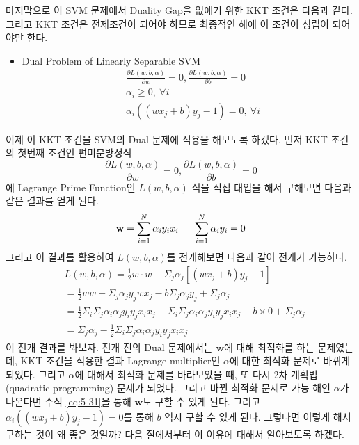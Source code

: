 \documentclass[a4paper]{oblivoir}
\begin{document}
마지막으로 이 SVM 문제에서 Duality Gap을 없애기 위한 KKT 조건은 다음과 같다. 그리고 KKT 조건은 전제조건이 되어야 하므로 최종적인 해에 이 조건이 성립이 되어야만 한다.
\begin{itemize}\setlength\itemsep{-\parsep}
	\item Dual Problem of Linearly Separable SVM
	\begin{equation}
	\begin{split}
	&\frac{\partial L(w,b,\alpha)}{\partial w}=0, \frac{\partial L(w,b,\alpha)}{\partial b}=0\\
	&\alpha_i \geq0,\ \forall i\\
	&\alpha_i ((wx_j+b)y_j-1)=0,\ \forall i
	\end{split}
	\label{eq:5-30}
	\end{equation}
\end{itemize}

이제 이 KKT 조건을 SVM의 Dual 문제에 적용을 해보도록 하겠다. 먼저 KKT 조건의 첫번째 조건인 편미분방정식 $$\frac{\partial L(w,b,\alpha)}{\partial w}=0, \frac{\partial L(w,b,\alpha)}{\partial b}=0$$에 Lagrange Prime Function인 $L(w,b,\alpha)$ 식을 직접 대입을 해서 구해보면 다음과 같은 결과를 얻게 된다.
\begin{equation}
\mathbf{w}=\sum_{i=1}^{N} \alpha_i y_i x_i\indent
\sum_{i=1}^{N} \alpha_i y_i=0
\label{eq:5-31}
\end{equation}
그리고 이 결과를 활용하여 $L(w,b,\alpha)$를 전개해보면 다음과 같이 전개가 가능하다.
\begin{equation}
\begin{split}
&L(w,b,\alpha)=\frac{1}{2}w\cdot w-\Sigma_{j}\alpha_j [(wx_j+b)y_j-1]\\
&=\frac{1}{2}ww-\Sigma_{j} \alpha_j y_j w x_j -b\Sigma_{j}\alpha_j y_j+\Sigma_j \alpha_j\\
&=\frac{1}{2}\Sigma_{i}\Sigma_{j}\alpha_i \alpha_j y_i y_j x_i x_j-\Sigma_{i}\Sigma_{j}\alpha_i \alpha_j y_i y_j x_i x_j-b\times 0+\Sigma_j \alpha_j\\
&=\Sigma_{j}\alpha_{j}-\frac{1}{2}\Sigma_{i}\Sigma_{j}\alpha_i \alpha_j y_i y_j x_i x_j
\end{split}
\end{equation}
\indent 이 전개 결과를 봐보자. 전개 전의 Dual 문제에서는 $\mathbf{w}$에 대해 최적화를 하는 문제였는데, KKT 조건을 적용한 결과 Lagrange multiplier인 $\alpha$에 대한 최적화 문제로 바뀌게 되었다. 그리고 $\alpha$에 대해서 최적화 문제를 바라보았을 때, 또 다시 2차 계획법(quadratic programming) 문제가 되었다. 그리고 바뀐 최적화 문제로 가능 해인 $\alpha$가 나온다면 수식 \eqref{eq:5-31}을 통해 $\mathbf{w}$도 구할 수 있게 된다. 그리고 $\alpha_i((wx_j+b)y_j-1)=0$를 통해 $b$ 역시 구할 수 있게 된다. 그렇다면 이렇게 해서 구하는 것이 왜 좋은 것일까? 다음 절에서부터 이 이유에 대해서 알아보도록 하겠다.
\end{document}
